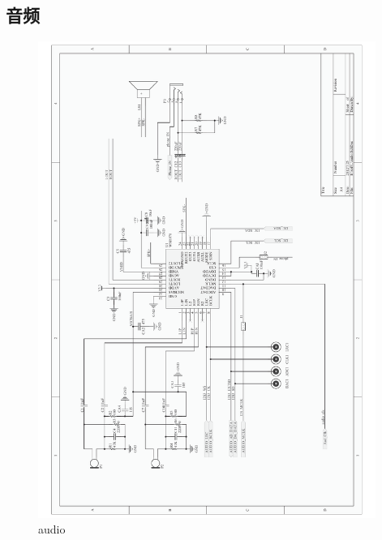 \documentclass[titlepage]{article}
\begin{document}
  \subsection{音频}
  \begin{figure}[h]
  \centering
 \includegraphics[width=11cm]{audio.pdf}
 \caption{audio}
 \end{figure}

 \newpage
\end{document}
